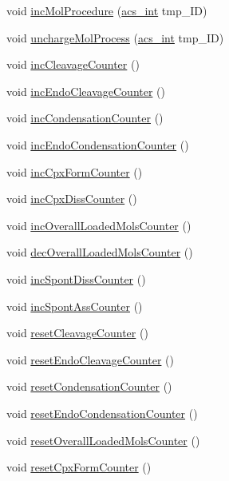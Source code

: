 \begin{DoxyCompactItemize}
void \hyperlink{a00011_a094499a0f1bb3c2342a3b16944f5280d}{inc\-Mol\-Procedure} (\hyperlink{a00024_a8d277355641a098190360234e2ebde35}{acs\-\_\-int} tmp\-\_\-\-I\-D)
\item 
void \hyperlink{a00011_af21c066ce18c8a39740f66a995782fb9}{uncharge\-Mol\-Process} (\hyperlink{a00024_a8d277355641a098190360234e2ebde35}{acs\-\_\-int} tmp\-\_\-\-I\-D)
\item 
void \hyperlink{a00011_a480887ed06f63d34e014c19ea302d3d5}{inc\-Cleavage\-Counter} ()
\item 
void \hyperlink{a00011_ab0fc2cd6ed209d61286b837bd5460d90}{inc\-Endo\-Cleavage\-Counter} ()
\item 
void \hyperlink{a00011_a3fae8e57fad9ef5b182e32d9bb9989af}{inc\-Condensation\-Counter} ()
\item 
void \hyperlink{a00011_a01812d540519696ab07c9f822119cc64}{inc\-Endo\-Condensation\-Counter} ()
\item 
void \hyperlink{a00011_afd3d590aa9b6a644cb360cc5fd47e16a}{inc\-Cpx\-Form\-Counter} ()
\item 
void \hyperlink{a00011_a73f88a08ff9206e48063cccb1729ee6b}{inc\-Cpx\-Diss\-Counter} ()
\item 
void \hyperlink{a00011_a719b14624d9a2f891b8d4eb47649a00e}{inc\-Overall\-Loaded\-Mols\-Counter} ()
\item 
void \hyperlink{a00011_a6686b0489ed94f11c4b03c011978f9af}{dec\-Overall\-Loaded\-Mols\-Counter} ()
\item 
void \hyperlink{a00011_a0c22436405fc1ec79d33485c2e80d817}{inc\-Spont\-Diss\-Counter} ()
\item 
void \hyperlink{a00011_aa2632ded9c384c3183c3ebebb530e2d7}{inc\-Spont\-Ass\-Counter} ()
\item 
void \hyperlink{a00011_a0b1e324c651c86cb54279e022c14dc6d}{reset\-Cleavage\-Counter} ()
\item 
void \hyperlink{a00011_a3362d147de095640619d9b44f7f20bba}{reset\-Endo\-Cleavage\-Counter} ()
\item 
void \hyperlink{a00011_ac7deab8db2f581077da735c3542d8f1b}{reset\-Condensation\-Counter} ()
\item 
void \hyperlink{a00011_a55cff0bc2f8de4d3e4db471cad580a86}{reset\-Endo\-Condensation\-Counter} ()
\item 
void \hyperlink{a00011_abc04de785dddab4703fdcf52ccdf85f9}{reset\-Overall\-Loaded\-Mols\-Counter} ()
\item 
void \hyperlink{a00011_a4cf4413f3028f8c5e33991ad5ba18e21}{reset\-Cpx\-Form\-Counter} ()
\item 

\end{DoxyCompactItemize}
